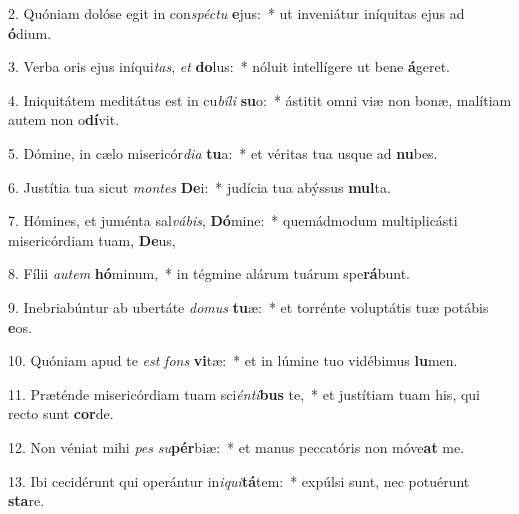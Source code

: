 2. Quóniam dolóse egit in con\textit{spéc}\textit{tu} \textbf{e}jus:~*  ut inveniátur iníquitas ejus ad \textbf{ó}dium.\

3. Verba oris ejus iníqui\textit{tas}, \textit{et} \textbf{do}lus:~*  nóluit intellígere ut bene \textbf{á}geret.\

4. Iniquitátem meditátus est in cu\textit{bí}\textit{li} \textbf{su}o:~*  ástitit omni viæ non bonæ, malítiam autem non o\textbf{dí}vit.\

5. Dómine, in cælo misericór\textit{di}\textit{a} \textbf{tu}a:~*  et véritas tua usque ad \textbf{nu}bes.\

6. Justítia tua sicut \textit{mon}\textit{tes} \textbf{De}i:~*  judícia tua abýssus \textbf{mul}ta.\

7. Hómines, et juménta sal\textit{vá}\textit{bis}, \textbf{Dó}mine:~*  quemádmodum multiplicásti misericórdiam tuam, \textbf{De}us,\

8. Fílii \textit{au}\textit{tem} \textbf{hó}minum,~*  in tégmine alárum tuárum spe\textbf{rá}bunt.\

9. Inebriabúntur ab ubertáte \textit{do}\textit{mus} \textbf{tu}æ:~*  et torrénte voluptátis tuæ potábis \textbf{e}os.\

10. Quóniam apud te \textit{est} \textit{fons} \textbf{vi}tæ:~*  et in lúmine tuo vidébimus \textbf{lu}men.\

11. Præténde misericórdiam tuam sci\textit{én}\textit{ti}\textbf{bus} te,~*  et justítiam tuam his, qui recto sunt \textbf{cor}de.\

12. Non véniat mihi \textit{pes} \textit{su}\textbf{pér}biæ:~*  et manus peccatóris non móve\textbf{at} me.\

13. Ibi cecidérunt qui operántur in\textit{i}\textit{qui}\textbf{tá}tem:~*  expúlsi sunt, nec potuérunt \textbf{sta}re.\

